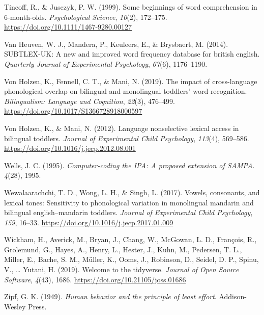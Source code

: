 \documentclass[
]{article}
\newlength{\cslhangindent}
\newlength{\cslentryspacingunit} %
\newenvironment{CSLReferences}[2] %
 {%
  \setlength{\parindent}{0pt}
  \ifodd #1
  \let\oldpar\par
  \def\par{\hangindent=\cslhangindent\oldpar}
  \fi
  \setlength{\parskip}{#2\cslentryspacingunit}
 }%
 {}
\begin{document}
\begin{CSLReferences}{1}{0}
\leavevmode{}%
Tincoff, R., \& Jusczyk, P. W. (1999). Some beginnings of word
comprehension in 6-month-olds. \emph{Psychological Science},
\emph{10}(2), 172--175. \url{https://doi.org/10.1111/1467-9280.00127}

\leavevmode{}%
Van Heuven, W. J., Mandera, P., Keuleers, E., \& Brysbaert, M. (2014).
{SUBTLEX}-{UK}: A new and improved word frequency database for british
english. \emph{Quarterly Journal of Experimental Psychology},
\emph{67}(6), 1176--1190.

\leavevmode{}%
Von Holzen, K., Fennell, C. T., \& Mani, N. (2019). The impact of
cross-language phonological overlap on bilingual and monolingual
toddlers' word recognition. \emph{Bilingualism: Language and Cognition},
\emph{22}(3), 476--499. \url{https://doi.org/10.1017/S1366728918000597}

\leavevmode{}%
Von Holzen, K., \& Mani, N. (2012). Language nonselective lexical access
in bilingual toddlers. \emph{Journal of Experimental Child Psychology},
\emph{113}(4), 569--586.
\url{https://doi.org/10.1016/j.jecp.2012.08.001}

\leavevmode{}%
Wells, J. C. (1995). \emph{Computer-coding the {IPA}: A proposed
extension of {SAMPA}}. \emph{4}(28), 1995.

\leavevmode{}%
Wewalaarachchi, T. D., Wong, L. H., \& Singh, L. (2017). Vowels,
consonants, and lexical tones: Sensitivity to phonological variation in
monolingual mandarin and bilingual english--mandarin toddlers.
\emph{Journal of Experimental Child Psychology}, \emph{159}, 16--33.
\url{https://doi.org/10.1016/j.jecp.2017.01.009}

\leavevmode{}%
Wickham, H., Averick, M., Bryan, J., Chang, W., McGowan, L. D.,
François, R., Grolemund, G., Hayes, A., Henry, L., Hester, J., Kuhn, M.,
Pedersen, T. L., Miller, E., Bache, S. M., Müller, K., Ooms, J.,
Robinson, D., Seidel, D. P., Spinu, V., \ldots{} Yutani, H. (2019).
Welcome to the tidyverse. \emph{Journal of Open Source Software},
\emph{4}(43), 1686. \url{https://doi.org/10.21105/joss.01686}

\leavevmode{}%
Zipf, G. K. (1949). \emph{Human behavior and the principle of least
effort}. Addison-Wesley Press.


\end{CSLReferences}
\end{document}
